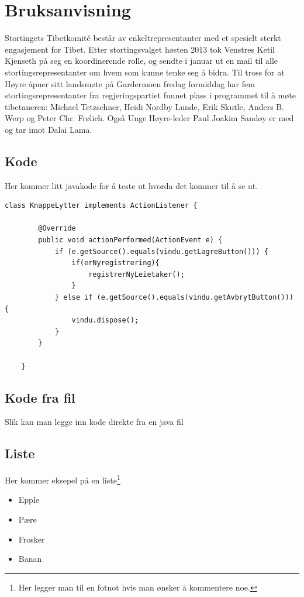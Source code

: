 \chapter{Bruksanvisning}

Stortingets Tibetkomité består av enkeltrepresentanter med et spesielt sterkt 
engasjement for Tibet. Etter stortingsvalget høsten 2013 tok Venstres Ketil 
Kjenseth på seg en koordinerende rolle, og sendte i januar ut en mail til alle 
stortingsrepresentanter om hvem som kunne tenke seg å bidra.
Til tross for at Høyre åpner sitt landsmøte på Gardermoen fredag formiddag har 
fem stortingsrepresentanter fra regjeringspartiet funnet plass i programmet til 
å møte tibetaneren: Michael Tetzschner, Heidi Nordby Lunde, Erik Skutle, Anders 
B. Werp og Peter Chr. Frølich. Også Unge Høyre-leder Paul Joakim Sandøy er med 
og tar imot Dalai Lama.

\section{Kode}
Her kommer litt javakode for å teste ut hvorda det kommer til å se ut.

\begin{lstlisting}[title=Eksempelkode, caption=Koden teller til 1000, label=brakode]
class KnappeLytter implements ActionListener {

        @Override
        public void actionPerformed(ActionEvent e) {
            if (e.getSource().equals(vindu.getLagreButton())) {
                if(erNyregistrering){
                    registrerNyLeietaker();
                }
            } else if (e.getSource().equals(vindu.getAvbrytButton())) {
                vindu.dispose();
            }
        }

    }
\end{lstlisting}


\section{Kode fra fil}
Slik kan man legge inn kode direkte fra en java fil





\section{Liste}
Her kommer eksepel på en liste\footnote{Her legger man til en fotnot hvis man ønsker å kommentere noe.}
\begin{itemize}
 \item Epple
 \item Pære
 \item Frosker
 \item Banan
\end{itemize}



